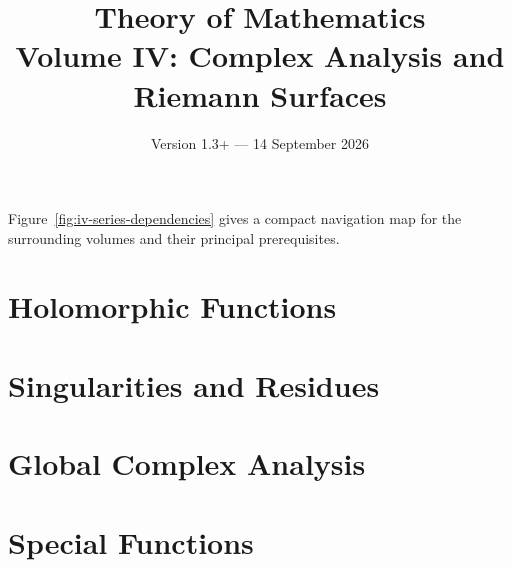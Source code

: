 \documentclass[11pt,a4paper,oneside,openany]{book}
\title{Theory of Mathematics\\[0.5em]\Large Volume IV: Complex Analysis and Riemann Surfaces}
\author{}
\date{Version 1.3+ --- 14 September 2026}
\begin{document}
\maketitle
\clearpage
\frontmatter
\tableofcontents


Figure~\ref{fig:iv-series-dependencies} gives a compact navigation map for the
surrounding volumes and their principal prerequisites.


\mainmatter

\part{Holomorphic Functions}







\part{Singularities and Residues}






\part{Global Complex Analysis}








\part{Special Functions}



\end{document}
